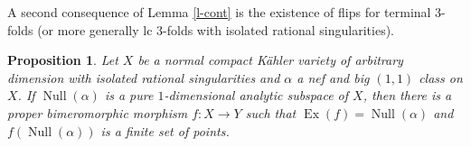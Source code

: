 \documentclass[12pt]{amsart}
\theoremstyle{plain}
\newtheorem{proposition}[theorem]{Proposition}
\theoremstyle{remark}
\theoremstyle{definition}
\def\Null{\operatorname{Null}}
\newcommand{\<}{\leq}
\def\Ex{\operatorname{Ex}}
\theoremstyle{definition}
\theoremstyle{definition}
\numberwithin{equation}{section}
\theoremstyle{remark}
\begin{document}
 














A second consequence of Lemma \ref{l-cont} is the existence of flips for terminal 3-folds (or more generally lc 3-folds with isolated rational singularities).

\begin{proposition}\label{p-1}
Let $X$ be a normal compact K\"ahler variety of arbitrary dimension with isolated rational singularities and $\alpha$ a nef and big $(1,1)$ class on $X$. If  $\Null(\alpha)$ is a pure $1$-dimensional analytic subspace of $X$, then there is a proper bimeromorphic morphism $f:X\to Y$ such that $\Ex(f)=\Null(\alpha)$ and $f(\Null(\alpha))$ is a finite set of points.

\end{proposition}
\end{document}
